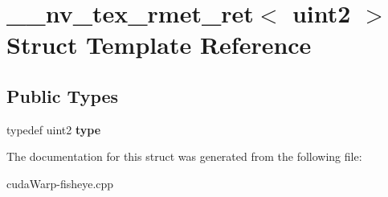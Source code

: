 \hypertarget{struct____nv__tex__rmet__ret_3_01uint2_01_4}{}\section{\+\_\+\+\_\+nv\+\_\+tex\+\_\+rmet\+\_\+ret$<$ uint2 $>$ Struct Template Reference}
\label{struct____nv__tex__rmet__ret_3_01uint2_01_4}
\subsection*{Public Types}
\begin{DoxyCompactItemize}
\item 
typedef uint2 {\bfseries type}\hypertarget{struct____nv__tex__rmet__ret_3_01uint2_01_4_acd11831c55735099f3a5cb9c0b531f83}{}\label{struct____nv__tex__rmet__ret_3_01uint2_01_4_acd11831c55735099f3a5cb9c0b531f83}

\end{DoxyCompactItemize}


The documentation for this struct was generated from the following file\+:\begin{DoxyCompactItemize}
\item 
cuda\+Warp-\/fisheye.\+cpp\end{DoxyCompactItemize}
